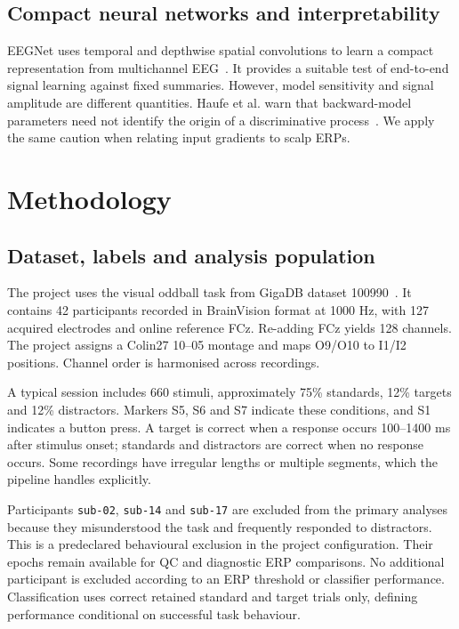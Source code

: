 \documentclass[11pt,a4paper]{article}
\newcommand{\code}[1]{\nolinkurl{#1}}
\begin{document}
\subsection{Compact neural networks and interpretability}
EEGNet uses temporal and depthwise spatial convolutions to learn a compact representation from multichannel EEG~\cite{eegnet}. It provides a suitable test of end-to-end signal learning against fixed summaries. However, model sensitivity and signal amplitude are different quantities. Haufe et al. warn that backward-model parameters need not identify the origin of a discriminative process~\cite{haufe}. We apply the same caution when relating input gradients to scalp ERPs.

\section{Methodology}
\subsection{Dataset, labels and analysis population}
The project uses the visual oddball task from GigaDB dataset 100990~\cite{dataset}. It contains 42 participants recorded in BrainVision format at 1000 Hz, with 127 acquired electrodes and online reference FCz. Re-adding FCz yields 128 channels. The project assigns a Colin27 10--05 montage and maps O9/O10 to I1/I2 positions. Channel order is harmonised across recordings.

A typical session includes 660 stimuli, approximately 75\% standards, 12\% targets and 12\% distractors. Markers S5, S6 and S7 indicate these conditions, and S1 indicates a button press. A target is correct when a response occurs 100--1400 ms after stimulus onset; standards and distractors are correct when no response occurs. Some recordings have irregular lengths or multiple segments, which the pipeline handles explicitly.

Participants \code{sub-02}, \code{sub-14} and \code{sub-17} are excluded from the primary analyses because they misunderstood the task and frequently responded to distractors. This is a predeclared behavioural exclusion in the project configuration. Their epochs remain available for QC and diagnostic ERP comparisons. No additional participant is excluded according to an ERP threshold or classifier performance. Classification uses correct retained standard and target trials only, defining performance conditional on successful task behaviour.
\end{document}
